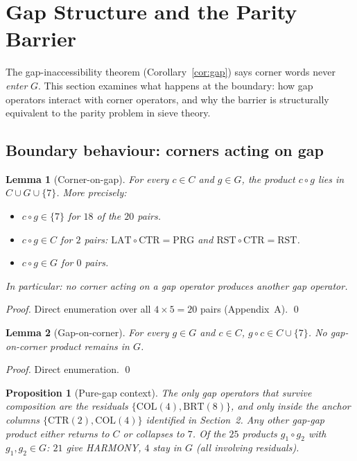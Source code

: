\documentclass[11pt]{article}
\newtheorem{proposition}{Proposition}
\newtheorem{lemma}{Lemma}
\begin{document}
\section{Gap Structure and the Parity Barrier}

The gap-inaccessibility theorem (Corollary~\ref{cor:gap}) says corner
words never \emph{enter} $G$.  This section examines what happens
at the boundary: how gap operators interact with corner operators,
and why the barrier is structurally equivalent to the parity problem
in sieve theory.

\subsection{Boundary behaviour: corners acting on gap}

\begin{lemma}[Corner-on-gap]\label{lem:cg}
For every $c\in C$ and $g\in G$, the product $c\circ g$ lies in
$C\cup G\cup\{7\}$.  More precisely:
\begin{itemize}
\item $c\circ g\in\{7\}$ for $18$ of the $20$ pairs.
\item $c\circ g\in C$ for $2$ pairs:
      $\mathrm{LAT}\circ\mathrm{CTR}=\mathrm{PRG}$ and
      $\mathrm{RST}\circ\mathrm{CTR}=\mathrm{RST}$.
\item $c\circ g\in G$ for $0$ pairs.
\end{itemize}
In particular: \emph{no corner acting on a gap operator produces
another gap operator.}
\end{lemma}

\begin{proof}
Direct enumeration over all $4\times5=20$ pairs (Appendix~A). \qed
\end{proof}

\begin{lemma}[Gap-on-corner]\label{lem:gc}
For every $g\in G$ and $c\in C$, $g\circ c\in C\cup\{7\}$.
No gap-on-corner product remains in $G$.
\end{lemma}

\begin{proof}
Direct enumeration. \qed
\end{proof}

\begin{proposition}[Pure-gap context]\label{prop:puregap}
The only gap operators that survive composition are the residuals
$\{\mathrm{COL}(4),\mathrm{BRT}(8)\}$, and only inside
the anchor columns $\{\mathrm{CTR}(2),\mathrm{COL}(4)\}$
identified in Section~2.
Any other gap-gap product either returns to $C$ or collapses to $7$.
Of the $25$ products $g_1\circ g_2$ with $g_1,g_2\in G$:
$21$ give HARMONY, $4$ stay in $G$ (all involving residuals).
\end{proposition}
\end{document}
